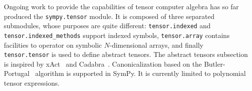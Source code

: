 Ongoing work to provide the capabilities of tensor computer algebra has so far
produced the \texttt{sympy.tensor} module.  It is composed of three separated
submodules, whose purposes are quite different: \texttt{tensor.indexed} and
\texttt{tensor.\allowbreak{}indexed\_methods} support indexed symbols,
\texttt{tensor.array} contains facilities to operator on symbolic $N$-dimensional
arrays, and finally \texttt{tensor.tensor} is used to define abstract tensors.
The abstract tensors subsection
is inspired by xAct~\cite{xAct} and Cadabra~\cite{Peeters2007cadabra}.
Canonicalization based on the Butler-Portugal~\cite{ManssurPortugal1999}
algorithm is supported in SymPy.  It is currently limited to polynomial tensor
expressions.
